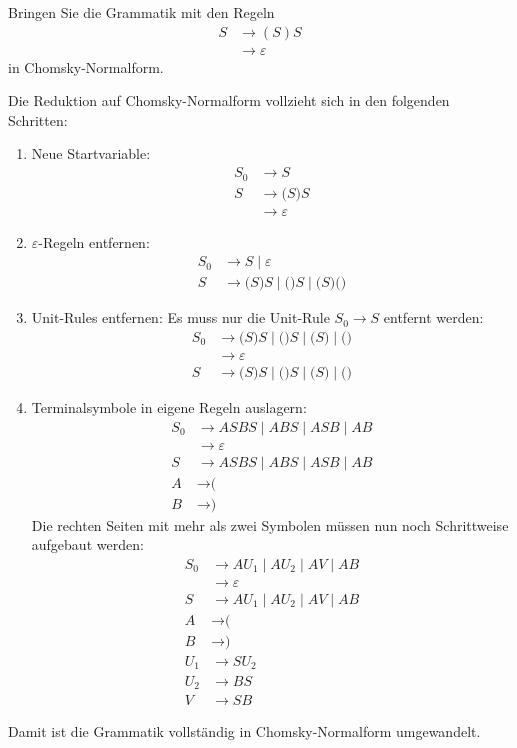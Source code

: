 Bringen Sie die Grammatik mit den Regeln
\begin{align*}
S&\rightarrow (S)S
\\
 &\rightarrow \varepsilon
\end{align*}
in Chomsky-Normalform.


\begin{loesung}
Die Reduktion auf Chomsky-Normalform vollzieht sich in den folgenden Schritten:
\begin{enumerate}
\item
Neue Startvariable:
\begin{align*}
S_0&\rightarrow S
\\
S&\rightarrow \texttt{(}S\texttt{)}S
\\
 &\rightarrow \varepsilon
\end{align*}
\item
$\varepsilon$-Regeln entfernen:
\begin{align*}
S_0&\rightarrow S \mid  \varepsilon
\\
S&\rightarrow \texttt{(}S\texttt{)}S \mid  \texttt{(}\texttt{)}S \mid 
  \texttt{(}S\texttt{)} \texttt{(}\texttt{)}
\end{align*}
\item
Unit-Rules entfernen: Es muss nur die Unit-Rule $S_0\to S$ entfernt
werden:
\begin{align*}
S_0& \rightarrow \texttt{(}S)S \mid  \texttt{(})S \mid  \texttt{(}S) \mid 
	\texttt{(})
\\
   &\rightarrow \varepsilon
\\
S&\rightarrow \texttt{(}S\texttt{)}S \mid  \texttt{(}\texttt{)}S \mid 
	\texttt{(}S\texttt{)} \mid  \texttt{(}\texttt{)}
\end{align*}
\item Terminalsymbole in eigene Regeln auslagern:
\begin{align*}
S_0& \rightarrow ASBS \mid  ABS \mid  ASB \mid  AB
\\
   &\rightarrow \varepsilon
\\
S&\rightarrow ASBS \mid  ABS \mid  ASB \mid  AB
\\
A&\rightarrow \texttt{(}
\\
B&\rightarrow \texttt{)}
\end{align*}
Die rechten Seiten mit mehr als zwei Symbolen müssen nun noch Schrittweise
aufgebaut werden:
\begin{align*}
S_0& \rightarrow AU_1 \mid  AU_2 \mid  AV \mid  AB
\\
   &\rightarrow \varepsilon
\\
S&\rightarrow AU_1 \mid  AU_2 \mid  AV \mid  AB
\\
A&\rightarrow \texttt{(}
\\
B&\rightarrow \texttt{)}
\\
U_1&\rightarrow SU_2\\
U_2&\rightarrow BS\\
V  &\rightarrow SB
\end{align*}
\end{enumerate}
Damit ist die Grammatik vollständig in Chomsky-Normalform umgewandelt.
\end{loesung}

